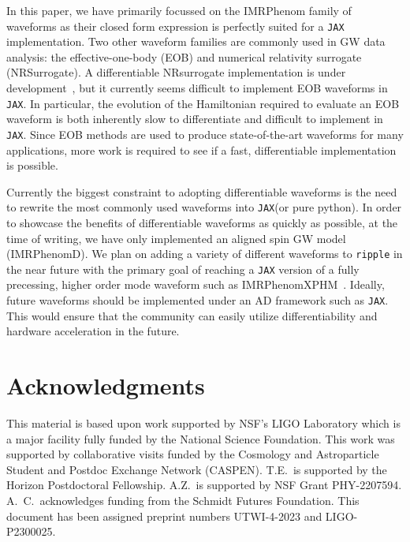 \documentclass[twocolumn]{aastex631}
\newcommand{\jax}{\texttt{JAX}\xspace}
\newcommand{\ripple}{\texttt{ripple}\xspace}
\begin{document}
In this paper, we have primarily focussed on the IMRPhenom family of waveforms as their closed form expression is perfectly suited for a \jax implementation.
Two other waveform families are commonly used in GW data analysis: the effective-one-body (EOB) and numerical relativity surrogate (NRSurrogate). 
A differentiable NRsurrogate implementation is under development~\citep{NRSurAD}, but it currently seems difficult to implement EOB waveforms in \jax.
In particular, the evolution of the Hamiltonian required to evaluate an EOB waveform is both inherently slow to differentiate and difficult to implement in \jax. 
Since EOB methods are used to produce state-of-the-art waveforms for many applications, more work is required to see if a fast, differentiable implementation is possible.

Currently the biggest constraint to adopting differentiable waveforms is the need to rewrite the most commonly used waveforms into \jax (or pure python).
In order to showcase the benefits of differentiable waveforms as quickly as possible, at the time of writing, we have only implemented an aligned spin GW model (IMRPhenomD).
We plan on adding a variety of different waveforms to \ripple in the near future with the primary goal of reaching a \jax version of a fully precessing, higher order mode waveform such as IMRPhenomXPHM~\citep{Pratten:2020ceb}.
Ideally, future waveforms should be implemented under an AD framework such as \jax.
This would ensure that the community can easily utilize differentiability and hardware acceleration in the future.


\section{Acknowledgments}
This material is based upon work supported by NSF's LIGO Laboratory which is a major facility fully funded by the National Science Foundation.
This work was supported by collaborative visits funded by the Cosmology and Astroparticle Student and Postdoc Exchange Network (CASPEN). 
T.E.\ is supported by the Horizon Postdoctoral Fellowship.
A.Z.~is supported by NSF Grant PHY-2207594.
A.~C.\ acknowledges funding from the Schmidt Futures Foundation.
This document has been assigned preprint numbers UTWI-4-2023 and LIGO-P2300025.


\end{document}

